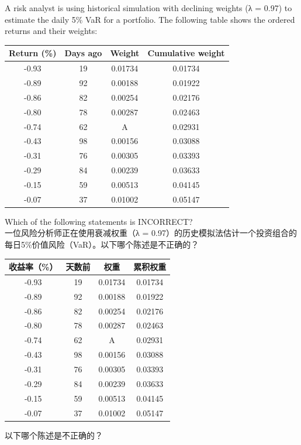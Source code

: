 \documentclass{article}
\newcounter{question} %
\begin{document}
\begin{question}
    A risk analyst is using historical simulation with declining weights (λ = 0.97) to estimate the daily 5\% VaR for a portfolio. The following table shows the ordered returns and their weights:

    \begin{center}
    \begin{tabular}{|c|c|c|c|}
    \hline
    Return (\%) & Days ago & Weight & Cumulative weight \\
    \hline
    -0.93 & 19 & 0.01734 & 0.01734 \\
    \hline
    -0.89 & 92 & 0.00188 & 0.01922 \\
    \hline
    -0.86 & 82 & 0.00254 & 0.02176 \\
    \hline
    -0.80 & 78 & 0.00287 & 0.02463 \\
    \hline
    -0.74 & 62 & A & 0.02931 \\
    \hline
    -0.43 & 98 & 0.00156 & 0.03088 \\
    \hline
    -0.31 & 76 & 0.00305 & 0.03393 \\
    \hline
    -0.29 & 84 & 0.00239 & 0.03633 \\
    \hline
    -0.15 & 59 & 0.00513 & 0.04145 \\
    \hline
    -0.07 & 37 & 0.01002 & 0.05147 \\
    \hline
    \end{tabular}
    \end{center}

    Which of the following statements is INCORRECT?
    \\一位风险分析师正在使用衰减权重（λ = 0.97）的历史模拟法估计一个投资组合的每日5\%价值风险（VaR）。以下哪个陈述是不正确的？
    \begin{center}
        \begin{tabular}{|c|c|c|c|}
        \hline
        收益率（\%） & 天数前 & 权重 & 累积权重 \\
        \hline
        -0.93 & 19 & 0.01734 & 0.01734 \\
        \hline
        -0.89 & 92 & 0.00188 & 0.01922 \\
        \hline
        -0.86 & 82 & 0.00254 & 0.02176 \\
        \hline
        -0.80 & 78 & 0.00287 & 0.02463 \\
        \hline
        -0.74 & 62 & A & 0.02931 \\
        \hline
        -0.43 & 98 & 0.00156 & 0.03088 \\
        \hline
        -0.31 & 76 & 0.00305 & 0.03393 \\
        \hline
        -0.29 & 84 & 0.00239 & 0.03633 \\
        \hline
        -0.15 & 59 & 0.00513 & 0.04145 \\
        \hline
        -0.07 & 37 & 0.01002 & 0.05147 \\
        \hline
        \end{tabular}
        \end{center}
    
        以下哪个陈述是不正确的？
\end{question}
\end{document}
